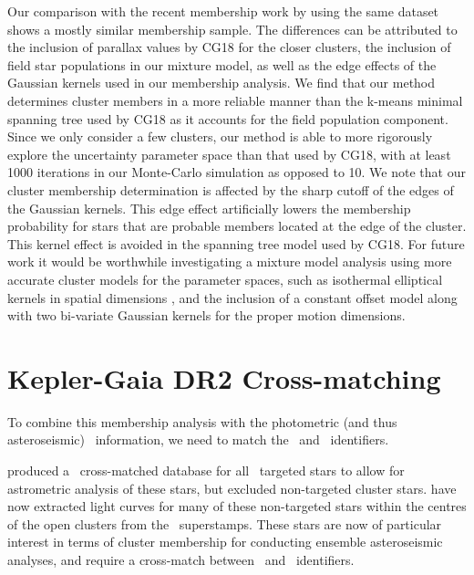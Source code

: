 Our comparison with the recent membership work by \cite{cantat-gaudin_gaia_2018} using the same dataset shows a mostly similar membership sample. The differences can be attributed to the inclusion of parallax values by CG18 for the closer clusters, the inclusion of field star populations in our mixture model, as well as the edge effects of the Gaussian kernels used in our membership analysis. We find that our method determines cluster members in a more reliable manner than the k-means minimal spanning tree used by CG18 as it accounts for the field population component. Since we only consider a few clusters, our method is able to more rigorously explore the uncertainty parameter space than that used by CG18, with at least 1000 iterations in our Monte-Carlo simulation as opposed to 10. We note that our cluster membership determination is affected by the sharp cutoff of the edges of the Gaussian kernels. This edge effect artificially lowers the membership probability for stars that are probable members located at the edge of the cluster. This kernel effect is avoided in the spanning tree model used by CG18. For future work it would be worthwhile investigating a mixture model analysis using more accurate cluster models for the parameter spaces, such as isothermal elliptical kernels in spatial dimensions \citep{kuhn_mixture_2017}, and the inclusion of a constant offset model along with two bi-variate Gaussian kernels for the proper motion dimensions.

\section{Kepler-Gaia DR2 Cross-matching}

To combine this membership analysis with the photometric (and thus asteroseismic) \Kepler~information, we need to match the \Kepler~and \Gaia~identifiers.

\citet{berger_revised_2018} produced a \Gaia~cross-matched database for all \Kepler~targeted stars to allow for astrometric analysis of these stars, but excluded non-targeted cluster stars. \cite{colman_pixels_2020} have now extracted light curves for many of these non-targeted stars within the centres of the open clusters from the \Kepler~superstamps. %
These stars are now of particular interest in terms of cluster membership for conducting ensemble asteroseismic analyses, and require a cross-match between \Kepler~and \Gaia~identifiers.

